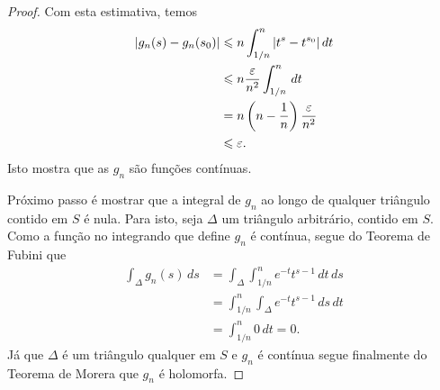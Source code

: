 \begin{proof}
    Com esta estimativa, temos 
    \begin{align*}
        |g_n(s)-g_n(s_0)| &\leqslant n
            \int_{1/n}^{n}
            |t^s-t^{s_0}| \, dt\\
            &\leqslant n \frac{\varepsilon}{n^2}\int_{1/n}^{n} \, dt \\
            &= n\left(n-\frac{1}{n}\right)\frac{\varepsilon}{n^2} \\
            &\leqslant \varepsilon.
    \end{align*}
    Isto mostra que as $g_n$ são funções contínuas.
        
    Próximo passo é mostrar que a integral de $g_n$ ao longo de qualquer
    triângulo contido em $S$ é nula. 
    Para isto, seja $\Delta$ um triângulo arbitrário, contido em $S$. 
    Como a função no integrando que define $g_n$ é contínua, 
    segue do Teorema de Fubini que
        \begin{align*}
            \int_{\Delta}g_n(s)\, ds &= \int_{\Delta}\int_{1/n}^{n}e^{-t}t^{s-1} \, dt \, ds \\
            &= \int_{1/n}^{n} \int_{\Delta} e^{-t}t^{s-1} \, ds \, dt  \\
            &= \int_{1/n}^{n} 0 \, dt = 0.
        \end{align*}
        Já que $\Delta$ é um triângulo qualquer em $S$ e $g_n$ é contínua segue finalmente do Teorema de Morera que $g_n$ é holomorfa.
        
        
        
    \bigskip 
    

\end{proof}
